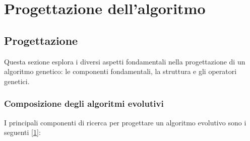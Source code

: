 \chapter{Progettazione dell'algoritmo}
\label{cap:analisi-requisiti}



\section{Progettazione}

Questa sezione esplora i diversi aspetti fondamentali nella progettazione di un algoritmo genetico: le componenti fondamentali, la struttura e gli operatori genetici.

\subsection{Composizione degli algoritmi evolutivi} \hypertarget{elementi}{}

I principali componenti di ricerca per progettare un algoritmo evolutivo sono i seguenti [\hyperlink{bibliografia}{1}]:

